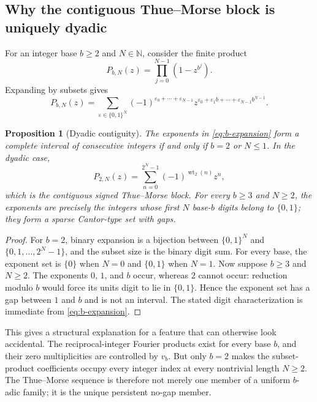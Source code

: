 \documentclass[11pt,oneside]{article}
\newtheorem{proposition}[theorem]{Proposition}
\theoremstyle{definition}
\theoremstyle{remark}
\newcommand{\N}{\mathbb N}
\newcommand{\wt}{\operatorname{wt}_2}
\begin{document}
\subsection{Why the contiguous Thue--Morse block is uniquely dyadic}

For an integer base $b\ge2$ and $N\in\N$, consider the finite product
\begin{equation}
 P_{b,N}(z)=\prod_{j=0}^{N-1}(1-z^{b^j}).                    \label{eq:b-product}
\end{equation}
Expanding by subsets gives
\begin{equation}
 P_{b,N}(z)
 =\sum_{\varepsilon\in\{0,1\}^N}
  (-1)^{\varepsilon_0+\cdots+\varepsilon_{N-1}}
  z^{\varepsilon_0+\varepsilon_1b+\cdots+\varepsilon_{N-1}b^{N-1}}. \label{eq:b-expansion}
\end{equation}

\begin{proposition}[Dyadic contiguity]
\label{prop:dyadic-contiguity}
The exponents in \eqref{eq:b-expansion} form a complete interval of consecutive integers if
and only if $b=2$ or $N\le1$.  In the dyadic case,
\begin{equation}
 P_{2,N}(z)=\sum_{n=0}^{2^N-1}(-1)^{\wt(n)}z^n,              \label{eq:tm-block}
\end{equation}
which is the contiguous signed Thue--Morse block.  For every $b\ge3$ and $N\ge2$, the
exponents are precisely the integers whose first $N$ base-$b$ digits belong to $\{0,1\}$;
they form a sparse Cantor-type set with gaps.
\end{proposition}

\begin{proof}
For $b=2$, binary expansion is a bijection between $\{0,1\}^N$ and
$\{0,1,\ldots,2^N-1\}$, and the subset size is the binary digit sum.  For every base, the
exponent set is $\{0\}$ when $N=0$ and $\{0,1\}$ when $N=1$.  Now suppose $b\ge3$ and
$N\ge2$.  The exponents $0$, $1$, and $b$ occur, whereas $2$ cannot occur: reduction modulo
$b$ would force its units digit to lie in $\{0,1\}$.  Hence the exponent set has a gap
between $1$ and $b$ and is not an interval.  The stated digit characterization is immediate
from \eqref{eq:b-expansion}.
\end{proof}

This gives a structural explanation for a feature that can otherwise look accidental.  The
reciprocal-integer Fourier products exist for every base $b$, and their zero multiplicities
are controlled by $v_b$.  But only $b=2$ makes the subset-product coefficients occupy every
integer index at every nontrivial length $N\ge2$.  The Thue--Morse sequence is therefore not
merely one member of a uniform $b$-adic family; it is the unique persistent no-gap member.
\end{document}

